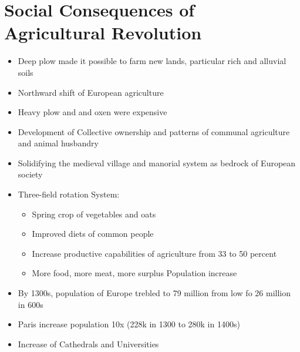 \documentclass{article}
\begin{document}
\section*{Social Consequences of Agricultural Revolution}
\begin{itemize}
  \item Deep plow made it possible to farm new lands,
    particular rich and alluvial soils
  \item Northward shift of European agriculture
  \item Heavy plow and and oxen were expensive
  \item Development of Collective ownership and patterns of communal
    agriculture and animal husbandry
  \item Solidifying the medieval village and manorial system as bedrock of European society
  \item Three-field rotation System:
    \begin{itemize}
      \item Spring crop of vegetables and oats
      \item Improved diets of common people
      \item Increase productive capabilities of agriculture
        from 33 to 50 percent
      \item More food, more meat, more surplus \rightarrow{} Population increase
    \end{itemize}
  \item By 1300s, population of Europe trebled to 79 million from low fo 26 million in 600s
  \item Paris increase population 10x (228k in 1300 to 280k in 1400s)
  \item Increase of Cathedrals and Universities
\end{itemize}
\end{document}
